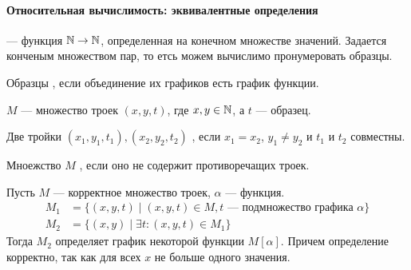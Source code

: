 \paragraph{Относительная вычислимость: эквивалентные определения}
\begin{defn}[Образец]
	 --- функция $ \mathbb{N} \to \mathbb{N}$, определенная на конечном множестве значений. Задается конченым множеством пар, то етсь  можем вычислимо пронумеровать образцы.
	
	\noindent
	Образцы , если объединение их графиков есть график функции.
\end{defn}
\begin{defn}[]
	$ M$ --- множество троек $ (x, y, t)$, где  $ x, y \in \mathbb{N}$, а $ t$ --- образец.

	\noindent
	Две тройки $ (x_1, y_1, t_1), (x_2, y_2, t_2)$ , если $  x_1= x_2$, $  y_1 \ne  y_2$ и $  t_1$ и $  t_2$ совместны.

	\noindent
	Мноежство $ M$ , если оно не содержит противоречащих троек.
\end{defn}
\begin{defn}
    Пусть  $  M$ --- корректное множество троек, $ \alpha $ --- функция.
	\[
	\begin{aligned}
		M_1& = \{(x, y, t) \mid (x, y, t) \in M, t \text{ --- подмножество графика } \alpha \} \\
		M_2&= \{(x, y) \mid \exists t\colon (x, y, t) \in M_1\}
	\end{aligned}
	\]
	Тогда $  M_2$ определяет график некоторой функции $ M[ \alpha ]$. Причем определение корректно, так как для всех $ x$ не больше одного значения.
\end{defn}

